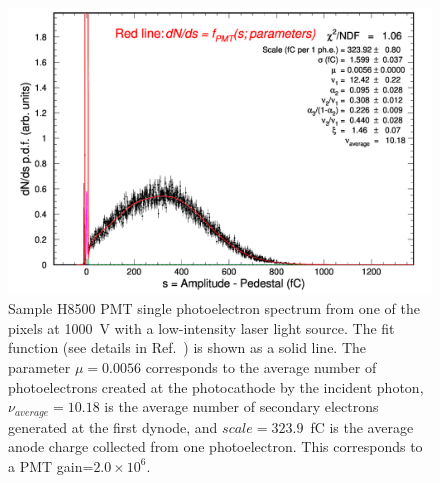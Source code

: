\documentclass[5p,times,twocolumn]{elsarticle}
\begin{document}
\begin{figure}[bth]
	\centering
	\includegraphics[width=\linewidth]{H8500-r-W0-CA7709-w3-g064-v1000-t227-37.pdf}
	\caption{Sample H8500 PMT single photoelectron spectrum from one of the pixels at 1000~V with a low-intensity
          laser light source. The fit function (see details in Ref.~\cite{Pavel}) is shown as a solid line. The parameter
          $\mu=0.0056$ corresponds to the average number of photoelectrons created at the photocathode by the
          incident photon,  $\nu_{average}=10.18$ is  the average number of secondary electrons generated at the first
          dynode, and $scale=323.9$~fC is the average anode charge collected from one photoelectron. This corresponds
          to a PMT gain=$2.0 \times 10^6$.}
	\label{fig:SPEH8500}
\end{figure}
\end{document}
